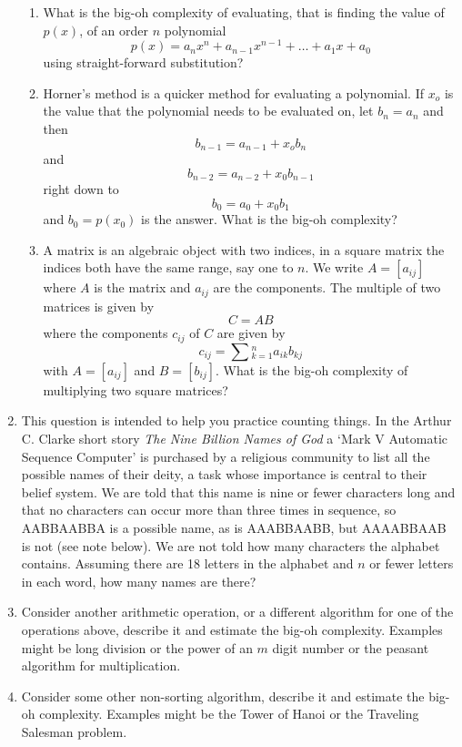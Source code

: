 \documentclass[11pt,a4paper]{scrartcl}
\begin{document}
\begin{enumerate}
\begin{enumerate}
\item What is the big-oh complexity of evaluating, that is finding the
  value of $p(x)$, of an order $n$ polynomial
$$p(x)=a_n x^n +a_{n-1}x^{n-1}+\ldots+a_1x+a_0$$
using straight-forward substitution?
\item Horner's method is a quicker method for evaluating a
  polynomial. If $x_o$ is the value that the polynomial needs to be
  evaluated on, let $b_n=a_n$ and then 
$$ b_{n-1}=a_{n-1}+x_o b_{n}$$
and
$$ b_{n-2}=a_{n-2}+x_0 b_{n-1}$$
right down to 
$$ b_0=a_0+x_0b_1$$ and $b_0=p(x_0)$ is the answer. What is the big-oh
complexity?
\item A matrix is an algebraic object with two indices, in a square
  matrix the indices both have the same range, say one to $n$. We
  write $A=[a_{ij}]$ where $A$ is the matrix and $a_{ij}$ are the
  components. The multiple of two matrices is given by
$$C=AB$$
where the components $c_{ij}$ of $C$ are given by
$$
c_{ij}=\sum\limits{_{k=1}^n}a_{ik}b_{kj}
$$ with $A=[a_{ij}]$ and $B=[b_{ij}]$. What is the big-oh complexity of
  multiplying two square matrices?




\end{enumerate}

\item This question is intended to help you practice counting
  things. In the Arthur C. Clarke short story \textsl{The Nine Billion
    Names of God} a \lq{}Mark V Automatic Sequence Computer\rq{} is
  purchased by a religious community to list all the possible names of
  their deity, a task whose importance is central to their belief
  system. We are told that this name is nine or fewer characters long
  and that no characters can occur more than three times in sequence,
  so AABBAABBA is a possible name, as is AAABBAABB, but AAAABBAAB is
  not (see note below). We are not told how many characters the
  alphabet contains. Assuming there are 18 letters in the alphabet and
  $n$ or fewer letters in each word, how many names are there?

\item Consider another arithmetic operation, or a different algorithm
  for one of the operations above, describe it and estimate the big-oh
  complexity. Examples might be long division or the power of an $m$
  digit number or the peasant algorithm for multiplication.

\item Consider some other non-sorting algorithm, describe it and
  estimate the big-oh complexity. Examples might be the Tower of Hanoi
  or the Traveling Salesman problem.
\end{enumerate}
\end{document}
